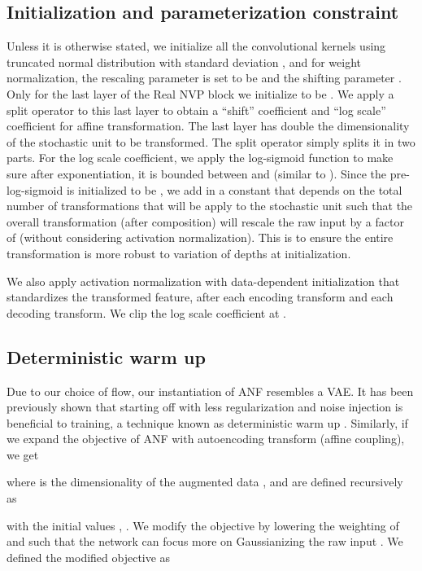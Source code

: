 \documentclass{article}
\begin{document}
\subsection{Initialization and parameterization constraint}
\label{app:init}
Unless it is otherwise stated, we initialize all the convolutional kernels using truncated normal distribution with standard deviation , and for weight normalization, the rescaling parameter is set to be  and the shifting parameter . 
Only for the last layer of the Real NVP block we initialize  to be . 
We apply a split operator to this last layer to obtain a ``shift'' coefficient and ``log scale'' coefficient for affine transformation. 
The last layer has double the dimensionality of the stochastic unit to be transformed.
The split operator simply splits it in two parts. 
For the log scale coefficient, we apply the log-sigmoid function to make sure after exponentiation, it is bounded between  and  (similar to \citet{kingma2018glow}). 
Since the pre-log-sigmoid is initialized to be , we add in a constant that depends on the total number of transformations that will be apply to the stochastic unit such that the overall transformation (after composition) will rescale the raw input by a factor of  (without considering activation normalization). 
This is to ensure the entire transformation is more robust to variation of depths at initialization. 

We also apply activation normalization \citep{kingma2018glow} with data-dependent initialization that standardizes the transformed feature, after each encoding transform and each decoding transform. 
We clip the log scale coefficient at .


\subsection{Deterministic warm up}
\label{app:warm}
Due to our choice of flow, our instantiation of ANF resembles a VAE. 
It has been previously shown that starting off with less regularization and noise injection is beneficial to training, a technique known as deterministic warm up \citep{raiko2007building,sonderby2016ladder}. 
Similarly, if we expand the objective of ANF with autoencoding transform (affine coupling), we get

where  is the dimensionality of the augmented data , and  are defined recursively as 
 
with the initial values , .
We modify the objective by lowering the weighting of  and  such that the network can focus more on Gaussianizing the raw input . 
We defined the modified objective as
\end{document}
